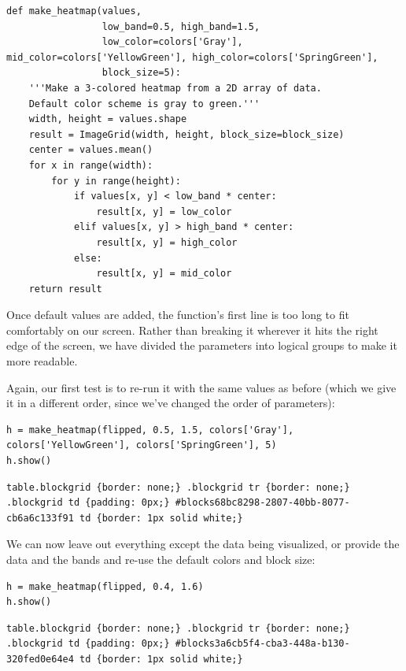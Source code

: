 \documentclass{book}
\begin{document}
\begin{verbatim}
def make_heatmap(values,
                 low_band=0.5, high_band=1.5,
                 low_color=colors['Gray'], mid_color=colors['YellowGreen'], high_color=colors['SpringGreen'],
                 block_size=5):
    '''Make a 3-colored heatmap from a 2D array of data.
    Default color scheme is gray to green.'''
    width, height = values.shape
    result = ImageGrid(width, height, block_size=block_size)
    center = values.mean()
    for x in range(width):
        for y in range(height):
            if values[x, y] < low_band * center:
                result[x, y] = low_color
            elif values[x, y] > high_band * center:
                result[x, y] = high_color
            else:
                result[x, y] = mid_color
    return result
\end{verbatim}

Once default values are added, the function's first line is too long to
fit comfortably on our screen. Rather than breaking it wherever it hits
the right edge of the screen, we have divided the parameters into
logical groups to make it more readable.

Again, our first test is to re-run it with the same values as before
(which we give it in a different order, since we've changed the order of
parameters):

\begin{verbatim}
h = make_heatmap(flipped, 0.5, 1.5, colors['Gray'], colors['YellowGreen'], colors['SpringGreen'], 5)
h.show()
\end{verbatim}

\begin{verbatim}
table.blockgrid {border: none;} .blockgrid tr {border: none;} .blockgrid td {padding: 0px;} #blocks68bc8298-2807-40bb-8077-cb6a6c133f91 td {border: 1px solid white;}
\end{verbatim}

We can now leave out everything except the data being visualized, or
provide the data and the bands and re-use the default colors and block
size:

\begin{verbatim}
h = make_heatmap(flipped, 0.4, 1.6)
h.show()
\end{verbatim}

\begin{verbatim}
table.blockgrid {border: none;} .blockgrid tr {border: none;} .blockgrid td {padding: 0px;} #blocks3a6cb5f4-cba3-448a-b130-320fed0e64e4 td {border: 1px solid white;}
\end{verbatim}
\end{document}
